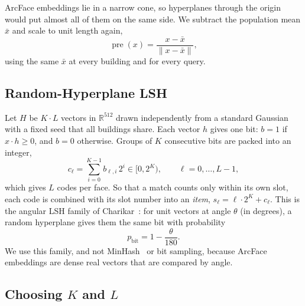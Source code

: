 \documentclass[runningheads]{llncs}
\begin{document}
ArcFace embeddings lie in a narrow cone, so hyperplanes through the origin would put almost all of them on the same
side. We subtract the population mean $\bar{x}$ and scale to unit length again,
\begin{equation}
  \operatorname{pre}(x)=\frac{x-\bar{x}}{\lVert x-\bar{x}\rVert},
\end{equation}
using the same $\bar{x}$ at every building and for every query.

\subsection{Random-Hyperplane LSH}

Let $H$ be $K\cdot L$ vectors in $\mathbb{R}^{512}$ drawn independently from a standard Gaussian with a fixed seed
that all buildings share. Each vector $h$ gives one bit: $b=1$ if $x\cdot h\ge 0$, and $b=0$ otherwise. Groups of $K$
consecutive bits are packed into an integer,
\begin{equation}
  c_\ell=\sum_{i=0}^{K-1} b_{\ell,i}\,2^{i}\in[0,2^{K}),\qquad \ell=0,\dots,L-1,
\end{equation}
which gives $L$ codes per face. So that a match counts only within its own slot, each code is combined with its slot
number into an \emph{item}, $s_\ell=\ell\cdot 2^{K}+c_\ell$. This is the angular LSH family of
Charikar~\cite{charikar2002}: for unit vectors at angle $\theta$ (in degrees), a random hyperplane gives them the
same bit with probability
\begin{equation}
  p_{\text{bit}}=1-\frac{\theta}{180}.
\end{equation}
We use this family, and not MinHash~\cite{broder1997} or bit sampling, because ArcFace embeddings are dense real
vectors that are compared by angle.

\subsection{Choosing $K$ and $L$}
\label{sec:kl}
\end{document}
